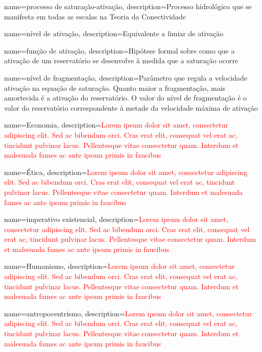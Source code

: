 {
    name=processo de saturação-ativação,
    description={Processo hidrológico que se manifesta em todas as escalas na Teoria da Conectividade}
}

{
    name=nível de ativação,
    description={Equivalente a limiar de ativação}
}

{
    name=função de ativação,
    description={Hipótese formal sobre como que a ativação de um reservatório se desenvolve à medida que a saturação ocorre}
}

{
    name=nível de fragmentação,
    description={Parâmetro que regula a velocidade ativação na equação de saturação. Quanto maior a fragmentação, mais amortecida é a ativação do reservatório. O valor do nível de fragmentação é o valor do reservatório correspondente à metade da velocidade máxima de ativação}
}

{
	name=Economia,
	description={\textcolor{red}{Lorem ipsum dolor sit amet, consectetur adipiscing elit. Sed ac bibendum orci. Cras erat elit, consequat vel erat ac, tincidunt pulvinar lacus. Pellentesque vitae consectetur quam. Interdum et malesuada fames ac ante ipsum primis in faucibus}}
}

{
	name=Ética,
	description={\textcolor{red}{Lorem ipsum dolor sit amet, consectetur adipiscing elit. Sed ac bibendum orci. Cras erat elit, consequat vel erat ac, tincidunt pulvinar lacus. Pellentesque vitae consectetur quam. Interdum et malesuada fames ac ante ipsum primis in faucibus}}
}

{
	name=imperativo existencial,
	description={\textcolor{red}{Lorem ipsum dolor sit amet, consectetur adipiscing elit. Sed ac bibendum orci. Cras erat elit, consequat vel erat ac, tincidunt pulvinar lacus. Pellentesque vitae consectetur quam. Interdum et malesuada fames ac ante ipsum primis in faucibus}}
}

{
	name=Humanismo,
	description={\textcolor{red}{Lorem ipsum dolor sit amet, consectetur adipiscing elit. Sed ac bibendum orci. Cras erat elit, consequat vel erat ac, tincidunt pulvinar lacus. Pellentesque vitae consectetur quam. Interdum et malesuada fames ac ante ipsum primis in faucibus}}
}

{
	name=antropocentrismo,
	description={\textcolor{red}{Lorem ipsum dolor sit amet, consectetur adipiscing elit. Sed ac bibendum orci. Cras erat elit, consequat vel erat ac, tincidunt pulvinar lacus. Pellentesque vitae consectetur quam. Interdum et malesuada fames ac ante ipsum primis in faucibus}}
}

